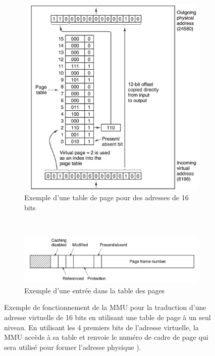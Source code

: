 \begin{figure}
    \centering
    \begin{subfigure}[b]{0.45\linewidth}
        \includegraphics[width=\linewidth]{images/memory_page_table_16bits.png}
        \caption{Exemple d'une table de page pour des adresses de 16 bits}
        \label{pic:memory_page_table_16bits}
    \end{subfigure}
    ~ %
    \begin{subfigure}[b]{0.45\linewidth}
        \includegraphics[width=\linewidth]{images/memory_page_table_entry.png}
        \caption{Exemple d'une entrée dans la table des pages}
        \label{pic:memory_page_table_entry}
    \end{subfigure}
    

    \caption{Exemple de fonctionnement de la MMU pour la traduction d'une adresse virtuelle de 16 bits en utilisant une table de page à un seul niveau. En utilisant les 4 premiers bits de l'adresse virtuelle, la MMU accède à sa table et renvoie le numéro de cadre de page qui sera utilisé pour former l'adresse physique \cite{tanenbaum2008systemes}). }\label{fig:memory_page_table_un_niveau}
\end{figure}


